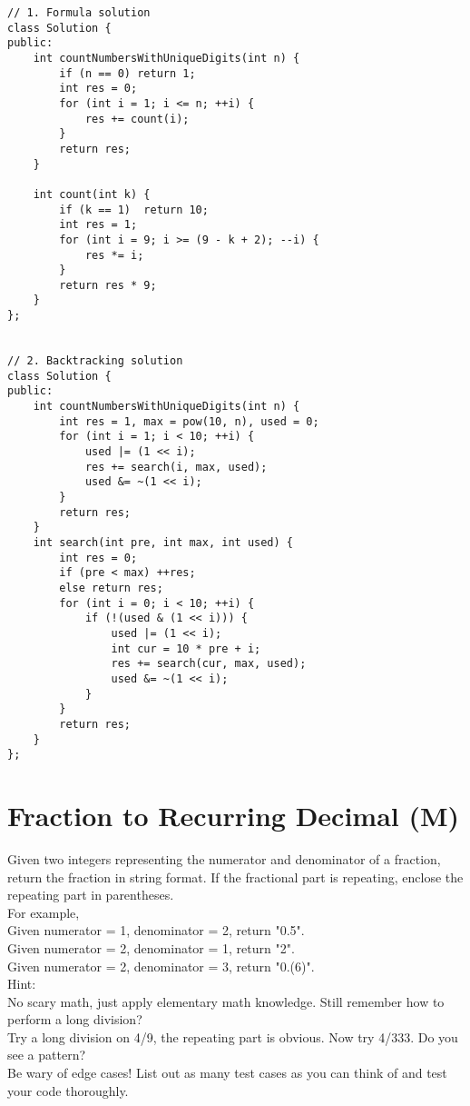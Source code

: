 \begin{lstlisting}
// 1. Formula solution
class Solution {
public:
    int countNumbersWithUniqueDigits(int n) {
        if (n == 0) return 1;
        int res = 0;
        for (int i = 1; i <= n; ++i) {
            res += count(i);
        }
        return res;
    }
    
    int count(int k) {
        if (k == 1)  return 10;
        int res = 1;
        for (int i = 9; i >= (9 - k + 2); --i) {
            res *= i;
        }
        return res * 9;
    }
};


// 2. Backtracking solution
class Solution {
public:
    int countNumbersWithUniqueDigits(int n) {
        int res = 1, max = pow(10, n), used = 0;
        for (int i = 1; i < 10; ++i) {
            used |= (1 << i);
            res += search(i, max, used);
            used &= ~(1 << i);
        }
        return res;
    }
    int search(int pre, int max, int used) {
        int res = 0;
        if (pre < max) ++res;
        else return res;
        for (int i = 0; i < 10; ++i) {
            if (!(used & (1 << i))) {
                used |= (1 << i);
                int cur = 10 * pre + i;
                res += search(cur, max, used);
                used &= ~(1 << i);
            }
        }
        return res;
    }
};
\end{lstlisting}


\section{Fraction to Recurring Decimal (M)}
Given two integers representing the numerator and denominator of a fraction, return the fraction in string format. If the fractional part is repeating, enclose the repeating part in parentheses.\\

For example,\\
    Given numerator = 1, denominator = 2, return "0.5".\\
    Given numerator = 2, denominator = 1, return "2".\\
    Given numerator = 2, denominator = 3, return "0.(6)".\\

Hint:\\
    No scary math, just apply elementary math knowledge. Still remember how to perform a long division?\\
    Try a long division on 4/9, the repeating part is obvious. Now try 4/333. Do you see a pattern?\\
    Be wary of edge cases! List out as many test cases as you can think of and test your code thoroughly.\\

